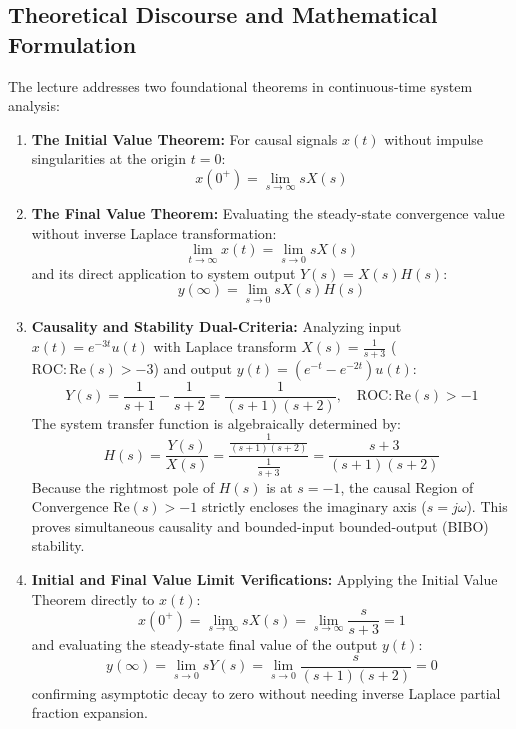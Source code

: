 \documentclass[11pt,a4paper,oneside]{report}
\begin{document}
\subsection{Theoretical Discourse and Mathematical Formulation}
The lecture addresses two foundational theorems in continuous-time system analysis:
\begin{enumerate}[noitemsep]
    \item \textbf{The Initial Value Theorem:} For causal signals $x(t)$ without impulse singularities at the origin $t = 0$:
    \begin{equation}
      x(0^+) = \lim_{s \to \infty} s X(s)
    \end{equation}
    \item \textbf{The Final Value Theorem:} Evaluating the steady-state convergence value without inverse Laplace transformation:
    \begin{equation}
      \lim_{t \to \infty} x(t) = \lim_{s \to 0} s X(s)
    \end{equation}
    and its direct application to system output $Y(s) = X(s) H(s)$:
    \begin{equation}
      y(\infty) = \lim_{s \to 0} s X(s) H(s)
    \end{equation}
    \item \textbf{Causality and Stability Dual-Criteria:} Analyzing input $x(t) = e^{-3t} u(t)$ with Laplace transform $X(s) = \frac{1}{s+3}$ ($\text{ROC}: \text{Re}(s) > -3$) and output $y(t) = (e^{-t} - e^{-2t}) u(t)$:
    \begin{equation}
      Y(s) = \frac{1}{s+1} - \frac{1}{s+2} = \frac{1}{(s+1)(s+2)}, \quad \text{ROC}: \text{Re}(s) > -1
    \end{equation}
    The system transfer function is algebraically determined by:
    \begin{equation}
      H(s) = \frac{Y(s)}{X(s)} = \frac{\frac{1}{(s+1)(s+2)}}{\frac{1}{s+3}} = \frac{s+3}{(s+1)(s+2)}
    \end{equation}
    Because the rightmost pole of $H(s)$ is at $s = -1$, the causal Region of Convergence $\text{Re}(s) > -1$ strictly encloses the imaginary axis ($s = j\omega$). This proves simultaneous causality and bounded-input bounded-output (BIBO) stability.
    \item \textbf{Initial and Final Value Limit Verifications:} Applying the Initial Value Theorem directly to $x(t)$:
    \begin{equation}
      x(0^+) = \lim_{s \to \infty} s X(s) = \lim_{s \to \infty} \frac{s}{s+3} = 1
    \end{equation}
    and evaluating the steady-state final value of the output $y(t)$:
    \begin{equation}
      y(\infty) = \lim_{s \to 0} s Y(s) = \lim_{s \to 0} \frac{s}{(s+1)(s+2)} = 0
    \end{equation}
    confirming asymptotic decay to zero without needing inverse Laplace partial fraction expansion.
\end{enumerate}
\end{document}
